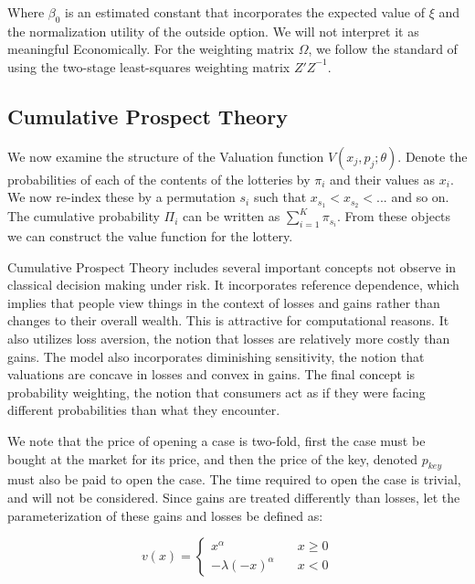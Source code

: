 \documentclass[12pt]{paper}
\newcommand{\inv}[1]{{#1}^{-1}}
\begin{document}
Where $\beta_0$ is an estimated constant that incorporates the expected
value of $\xi$ and the normalization utility of the outside option. We
will not interpret it as meaningful Economically. For the weighting
matrix $\Omega$, we follow the standard of using the two-stage
least-squares weighting matrix $\inv{Z'Z}$. 



\subsection{Cumulative Prospect Theory}


We now examine the structure of the Valuation function $V( x_j,
p_j; \theta)$. Denote the probabilities of each of the contents of the
lotteries by $\pi_i$ and their values as $x_i$. We now re-index these by
a permutation $s_i$ such that $x_{s_1} < x_{s_2} < ...$ and so on. The
cumulative probability $\Pi_i$ can be written as $\sum_{i=1}^K
\pi_{s_i}$. From these objects we can construct the value function for
the lottery.

Cumulative Prospect Theory includes several important concepts not
observe in classical decision making under risk. It incorporates
reference dependence, which implies that people view things in the
context of losses and gains rather than changes to their overall
wealth. This is attractive for computational reasons. It also utilizes
loss aversion, the notion that losses are relatively more costly than
gains. The model also incorporates diminishing sensitivity, the notion
that valuations are concave in losses and convex in gains. The final
concept is probability weighting, the notion that consumers act as if
they were facing different probabilities than what they encounter.

We note that the price of opening a case is two-fold, first the case
must be bought at the market for its price, and then the price of the
key, denoted $p_{key}$ must also be paid to open the case. The time
required to open the case is trivial, and will not be
considered. Since gains are treated differently than losses, let the
parameterization of these gains and losses be defined as:

\begin{equation*}
  v(x) =
  \begin{cases}
    x^\alpha \quad &x \geq 0\\
    -\lambda(-x)^\alpha \quad &x < 0
  \end{cases}
\end{equation*}
\end{document}
